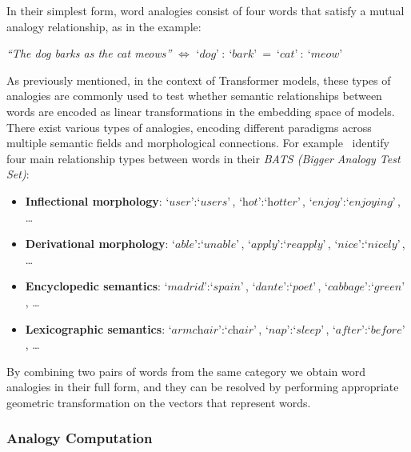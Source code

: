In their simplest form, word analogies consist of four words that satisfy a mutual analogy relationship, as in the example:
\begin{center}
    \emph{``The dog barks as the cat meows''} $\Longleftrightarrow$ $\textit{`dog'}\ :\ \textit{`bark'}\ =\ \textit{`cat'}\ :\ \textit{`meow'}$
\end{center}
As previously mentioned, in the context of Transformer models, these types of analogies are commonly used to test whether semantic relationships between words are encoded as linear transformations in the embedding space of models.
There exist various types of analogies, encoding different paradigms across multiple semantic fields and morphological connections.
For example~\citet{drozd2016} identify four main relationship types between words in their \emph{BATS (Bigger Analogy Test Set)}: 
\begin{itemize}
    \item \textbf{Inflectional morphology}: $\textit{`user'}\!:\!\textit{`users'}$, $\textit{`hot'}\!:\!\textit{`hotter'}$, $\textit{`enjoy'}\!:\!\textit{`enjoying'}$, \dots
    \item \textbf{Derivational morphology}: $\textit{`able'}\!:\!\textit{`unable'}$, $\textit{`apply'}\!:\!\textit{`reapply'}$, $\textit{`nice'}\!:\!\textit{`nicely'}$, \dots
    \item \textbf{Encyclopedic semantics}: $\textit{`madrid'}\!:\!\textit{`spain'}$, $\textit{`dante'}\!:\!\textit{`poet'}$, $\textit{`cabbage'}\!:\!\textit{`green'}$, \dots
    \item \textbf{Lexicographic semantics}: $\textit{`armchair'}\!:\!\textit{`chair'}$, $\textit{`nap'}\!:\!\textit{`sleep'}$, $\textit{`after'}\!:\!\textit{`before'}$, \dots
\end{itemize}
By combining two pairs of words from the same category we obtain word analogies in their full form, and they can be resolved by performing appropriate geometric transformation on the vectors that represent words.

\subsubsection{Analogy Computation}

